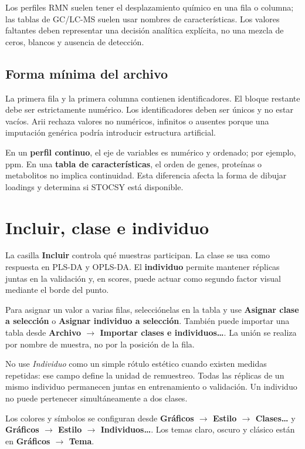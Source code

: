 \documentclass[11pt,a4paper,openany]{report}
\newcommand{\menu}[1]{\textbf{#1}}
\begin{document}
Los perfiles RMN suelen tener el desplazamiento químico en una fila o columna;
las tablas de GC/LC-MS suelen usar nombres de características. Los valores
faltantes deben representar una decisión analítica explícita, no una mezcla de
ceros, blancos y ausencia de detección.

\subsection{Forma mínima del archivo}

La primera fila y la primera columna contienen identificadores. El bloque
restante debe ser estrictamente numérico. Los identificadores deben ser únicos y
no estar vacíos. Arii rechaza valores no numéricos, infinitos o ausentes porque
una imputación genérica podría introducir estructura artificial.

En un \textbf{perfil continuo}, el eje de variables es numérico y ordenado; por
ejemplo, ppm. En una \textbf{tabla de características}, el orden de genes,
proteínas o metabolitos no implica continuidad. Esta diferencia afecta la forma
de dibujar loadings y determina si STOCSY está disponible.

\section{Incluir, clase e individuo}

La casilla \menu{Incluir} controla qué muestras participan. La clase se usa como
respuesta en PLS-DA y OPLS-DA. El \menu{individuo} permite mantener réplicas juntas en la validación y, en scores, puede actuar como segundo factor visual mediante el borde del punto.

Para asignar un valor a varias filas, selecciónelas en la tabla y use
\menu{Asignar clase a selección} o \menu{Asignar individuo a selección}. También
puede importar una tabla desde
\menu{Archivo \texorpdfstring{$\rightarrow$}{ > } Importar clases e individuos…}.
La unión se realiza por nombre de muestra, no por la posición de la fila.

No use \emph{Individuo} como un simple rótulo estético cuando existen medidas
repetidas: ese campo define la unidad de remuestreo. Todas las réplicas de un
mismo individuo permanecen juntas en entrenamiento o validación. Un individuo
no puede pertenecer simultáneamente a dos clases.

Los colores y símbolos se configuran desde
\menu{Gráficos \texorpdfstring{$\rightarrow$}{ > } Estilo
\texorpdfstring{$\rightarrow$}{ > } Clases…} y
\menu{Gráficos \texorpdfstring{$\rightarrow$}{ > } Estilo
\texorpdfstring{$\rightarrow$}{ > } Individuos…}. Los temas claro, oscuro y
clásico están en
\menu{Gráficos \texorpdfstring{$\rightarrow$}{ > } Tema}.
\end{document}
